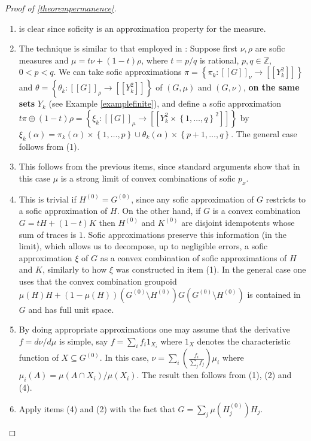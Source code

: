\documentclass[11pt]{amsart}
\theoremstyle{plain}    \newtheorem{theorem}[generalnumbering]{Theorem}
\theoremstyle{plain}    \newtheorem{corollary}[generalnumbering]{Corollary}
\theoremstyle{definition}   \newtheorem{definition}[generalnumbering]{Definition}
\theoremstyle{definition}   \newtheorem{example}[generalnumbering]{Example}
\theoremstyle{plain}    \newtheorem{proposition}[generalnumbering]{Proposition}
\theoremstyle{plain}    \newtheorem{lemma}[generalnumbering]{Lemma}
\theoremstyle{plain}    \newtheorem{plainstyle}[generalnumbering]{\namefordifferentenvironment}
\theoremstyle{plain}    \newtheorem*{plainstyle*}{\namefordifferentenvironment}
\theoremstyle{definition}    \newtheorem{definitionstyle}[generalnumbering]{\namefordifferentenvironment}
\theoremstyle{definition}    \newtheorem*{definitionstyle*}{\namefordifferentenvironment}
\begin{document}
\begin{proof}[Proof of \ref{theorempermanence}]
\begin{enumerate}
\item is clear since soficity is an approximation property for the measure.
\item The technique is similar to that employed in \cite{MR3227158}: Suppose first $\nu,\rho$ are sofic measures and $\mu=t\nu+(1-t)\rho$, where $t=p/q$ is rational, $p,q\in\mathbb{Z}$, $0<p<q$. We can take sofic approximations $\pi=\left\{\pi_k:[[G]]_\nu\to[[Y_k^2]]\right\}$ and $\theta=\left\{\theta_k:[[G]]_\rho\to[[Y_k^2]]\right\}$ of $(G,\mu)$ and $(G,\nu)$, \textbf{on the same sets} $Y_k$ (see Example \ref{examplefinite}), and define a sofic approximation $t\pi\oplus(1-t)\rho=\left\{\xi_k:[[G]]_\mu\to[[Y_k^2\times\left\{1,\ldots,q\right\}^2]]\right\}$ by $\xi_k(\alpha)=\pi_k(\alpha)\times\left\{1,\ldots,p\right\}\cup\theta_k(\alpha)\times\left\{p+1,\ldots,q\right\}$. The general case follows from (1).
%
\item This follows from the previous items, since standard arguments show that in this case $\mu$ is a strong limit of convex combinations of sofic $p_x$.
%
\item This is trivial if $H^{(0)}=G^{(0)}$, since any sofic approximation of $G$ restricts to a sofic approximation of $H$. On the other hand, if $G$ is a convex combination $G=tH+(1-t)K$ then $H^{(0)}$ and $K^{(0)}$ are disjoint idempotents whose sum of traces is $1$. Sofic approximations preserve this information (in the limit), which allows us to decompose, up to negligible errors, a sofic approximation $\xi$ of $G$ as a convex combination of sofic approximations of $H$ and $K$, similarly to how $\xi$ was constructed in item (1). In the general case one uses that the convex combination groupoid ${\mu(H)H+(1-\mu(H))(G^{(0)}\setminus H^{(0)})G(G^{(0)}\setminus H^{(0)})}$ is contained in $G$ and has full unit space.
%
\item By doing appropriate approximations one may assume that the derivative $f=d\nu/d\mu$ is simple, say $f=\sum_i f_i 1_{X_i}$ where $1_X$ denotes the characteristic function of $X\subseteq G^{(0)}$. In this case, $\nu=\sum_i\left(\frac{f_i}{\sum_j f_j}\right)\mu_i$ where $\mu_i(A)=\mu(A\cap X_i)/\mu(X_i)$. The result then follows from (1), (2) and (4).
\item Apply items (4) and (2) with the fact that $G=\sum_j \mu(H_j^{(0)})H_j$.\qedhere
\end{enumerate}
\end{proof}
\end{document}
